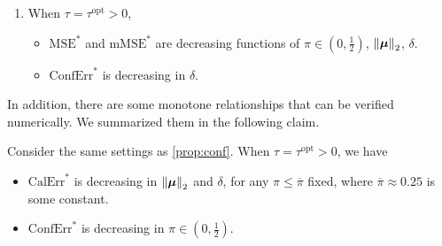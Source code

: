 \begin{prop}
\begin{enumerate}[label=(\alph*)]
        \item \label{prop:conf_mono}
        When $\tau = \tau^\mathrm{opt} > 0$, 
        \begin{itemize}
            \item $\mathrm{MSE}^*$ and $\mathrm{mMSE}^*$ are decreasing functions of $\pi \in (0, \frac12)$, $\left\|{\text{\boldmath $\mu$}}\right\|_2$, $\delta$.
            \item $\mathrm{ConfErr}^*$ is decreasing in $\delta$.
            
        \end{itemize}
    \end{enumerate}
\end{prop}
In addition, there are some monotone relationships that can be verified numerically. We summarized them in the following claim.
\begin{claim}\label{claim:conf}
    Consider the same settings as \cref{prop:conf}. When $\tau = \tau^\mathrm{opt} > 0$, we have
    \begin{itemize}
            \item $\mathrm{CalErr}^*$ is decreasing in $\left\|{\text{\boldmath $\mu$}}\right\|_2$ and $\delta$, for any $\pi \le \overline{\pi}$ fixed, where $\overline{\pi} \approx 0.25$ is some constant.
            \item $\mathrm{ConfErr}^*$ is decreasing in $\pi \in (0, \frac12)$.
        \end{itemize}
\end{claim}